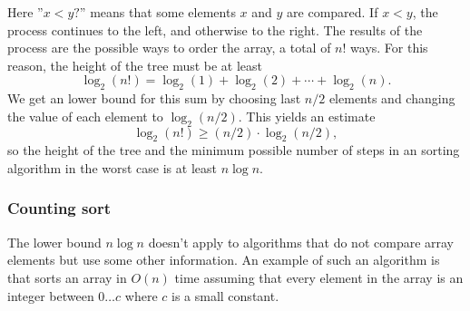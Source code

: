 \begin{center}
\end{center}

Here ''$x<y?$'' means that some elements
$x$ and $y$ are compared.
If $x<y$, the process continues to the left,
and otherwise to the right.
The results of the process are the possible
ways to order the array, a total of $n!$ ways.
For this reason, the height of the tree
must be at least
\[ \log_2(n!) = \log_2(1)+\log_2(2)+\cdots+\log_2(n).\]
We get an lower bound for this sum
by choosing last $n/2$ elements and
changing the value of each element to $\log_2(n/2)$.
This yields an estimate
\[ \log_2(n!) \ge (n/2) \cdot \log_2(n/2),\]
so the height of the tree and the minimum
possible number of steps in an sorting
algorithm in the worst case
is at least $n \log n$.

\subsubsection{Counting sort}


The lower bound $n \log n$ doesn't apply to
algorithms that do not compare array elements
but use some other information.
An example of such an algorithm is
 that sorts an array in
$O(n)$ time assuming that every element in the array
is an integer between $0 \ldots c$ where $c$
is a small constant.

